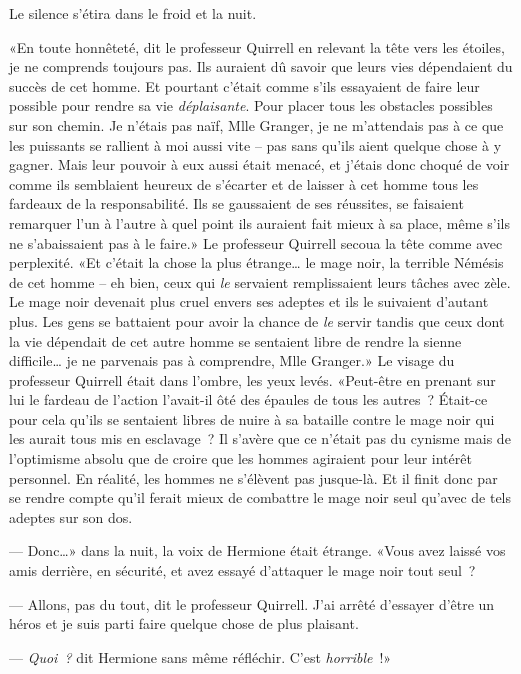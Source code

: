 Le silence s'étira dans le froid et la nuit.

«En toute honnêteté, dit le professeur Quirrell en relevant la tête vers les étoiles, je ne comprends toujours pas. Ils auraient dû savoir que leurs vies dépendaient du succès de cet homme. Et pourtant c'était comme s'ils essayaient de faire leur possible pour rendre sa vie \emph{déplaisante}. Pour placer tous les obstacles possibles sur son chemin. Je n'étais pas naïf, Mlle Granger, je ne m'attendais pas à ce que les puissants se rallient à moi aussi vite -- pas sans qu'ils aient quelque chose à y gagner. Mais leur pouvoir à eux aussi était menacé, et j'étais donc choqué de voir comme ils semblaient heureux de s'écarter et de laisser à cet homme tous les fardeaux de la responsabilité. Ils se gaussaient de ses réussites, se faisaient remarquer l'un à l'autre à quel point ils auraient fait mieux à sa place, même s'ils ne s'abaissaient pas à le faire.» Le professeur Quirrell secoua la tête comme avec perplexité. «Et c'était la chose la plus étrange… le mage noir, la terrible Némésis de cet homme -- eh bien, ceux qui \emph{le} servaient remplissaient leurs tâches avec zèle. Le mage noir devenait plus cruel envers ses adeptes et ils le suivaient d'autant plus. Les gens se battaient pour avoir la chance de \emph{le} servir tandis que ceux dont la vie dépendait de cet autre homme se sentaient libre de rendre la sienne difficile… je ne parvenais pas à comprendre, Mlle Granger.» Le visage du professeur Quirrell était dans l'ombre, les yeux levés. «Peut-être en prenant sur lui le fardeau de l'action l'avait-il ôté des épaules de tous les autres~? Était-ce pour cela qu'ils se sentaient libres de nuire à sa bataille contre le mage noir qui les aurait tous mis en esclavage~? Il s'avère que ce n'était pas du cynisme mais de l'optimisme absolu que de croire que les hommes agiraient pour leur intérêt personnel. En réalité, les hommes ne s'élèvent pas jusque-là. Et il finit donc par se rendre compte qu'il ferait mieux de combattre le mage noir seul qu'avec de tels adeptes sur son dos.

--- Donc…» dans la nuit, la voix de Hermione était étrange. «Vous avez laissé vos amis derrière, en sécurité, et avez essayé d'attaquer le mage noir tout seul~?

--- Allons, pas du tout, dit le professeur Quirrell. J'ai arrêté d'essayer d'être un héros et je suis parti faire quelque chose de plus plaisant.

--- \emph{Quoi~?} dit Hermione sans même réfléchir. C'est \emph{horrible}~!»

